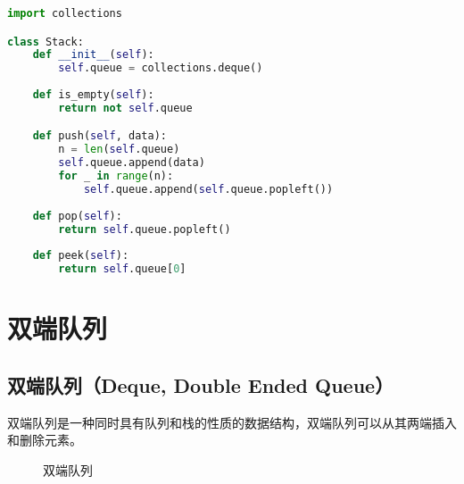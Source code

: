 
\begin{lstlisting}[language=Python]
import collections

class Stack:
    def __init__(self):
        self.queue = collections.deque()
    
    def is_empty(self):
        return not self.queue

    def push(self, data):
        n = len(self.queue)
        self.queue.append(data)
        for _ in range(n):
            self.queue.append(self.queue.popleft())
    
    def pop(self):
        return self.queue.popleft()
    
    def peek(self):
        return self.queue[0]
\end{lstlisting}

\newpage


\section{双端队列}

\subsection{双端队列（Deque, Double Ended Queue）}

双端队列是一种同时具有队列和栈的性质的数据结构，双端队列可以从其两端插入和删除元素。

\begin{figure}[H]
	\centering
	\caption{双端队列}
\end{figure}


